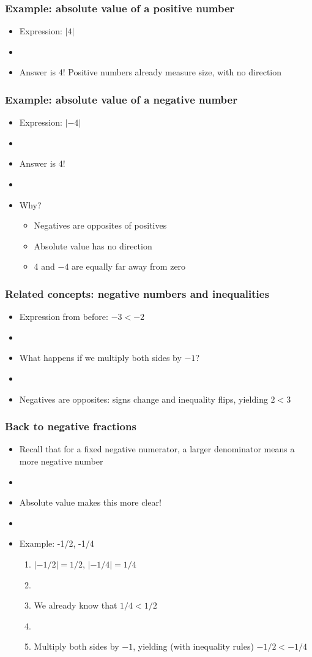 \documentclass[12pt]{beamer}
\newcommand{\myframe}[1]{\begin{frame} \frametitle{#1}}
\begin{document}
\myframe{Example: absolute value of a positive number}
\begin{itemize}
\item Expression: $|4|$
\item[]
\item Answer is 4! Positive numbers already measure size, with no direction
\end{itemize}
\end{frame}

\myframe{Example: absolute value of a negative number}
\begin{itemize}
\item Expression: $|-4|$
\item[]
\item Answer is 4!
\item[]
\item Why?
\begin{itemize}
\item Negatives are opposites of positives
\item Absolute value has no direction
\item 4 and $-4$ are equally far away from zero
\end{itemize}
\end{itemize}
\end{frame}

\myframe{Related concepts: negative numbers and inequalities}
\begin{itemize}
\item Expression from before: $-3 < -2$
\item[]
\item What happens if we multiply both sides by $-1$?
\item[]
\item Negatives are opposites: signs change and inequality flips, yielding $2 < 3$
\end{itemize}
\end{frame}

\myframe{Back to negative fractions}
\begin{itemize}
\item Recall that for a fixed negative numerator, a larger denominator means a more negative number 
\item[]
\item Absolute value makes this more clear!
\item[]
\item Example: -1/2, -1/4
\begin{enumerate}
\item $|-1/2| = 1/2$, $|-1/4| = 1/4$
\item[]
\item We already know that $1/4 < 1/2$
\item[]
\item Multiply both sides by $-1$, yielding (with inequality rules) $-1/2 < -1/4$
\end{enumerate}
\end{itemize}
\end{frame}
\end{document}

